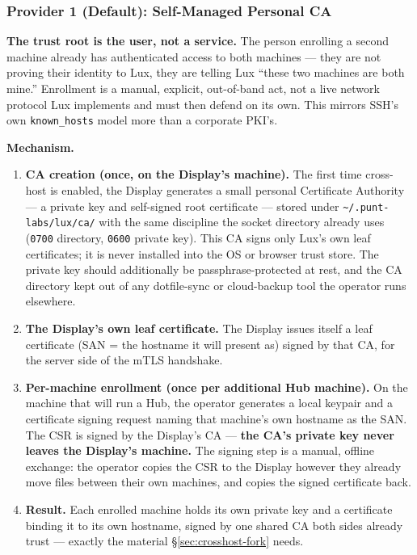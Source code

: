 \documentclass[a4paper,10pt]{article}
\begin{document}
\subsubsection{Provider 1 (Default): Self-Managed Personal CA}

\textbf{The trust root is the user, not a service.}  The person enrolling
a second machine already has authenticated access to both machines ---
they are not proving their identity to Lux, they are telling Lux ``these
two machines are both mine.''  Enrollment is a manual, explicit,
out-of-band act, not a live network protocol Lux implements and must then
defend on its own.  This mirrors SSH's own \texttt{known\_hosts} model
more than a corporate PKI's.

\textbf{Mechanism.}

\begin{enumerate}
  \item \textbf{CA creation (once, on the Display's machine).}  The first
    time cross-host is enabled, the Display generates a small personal
    Certificate Authority --- a private key and self-signed root
    certificate --- stored under
    \texttt{\textasciitilde{}/.punt-labs/lux/ca/} with the same discipline
    the socket directory already uses (\texttt{0700} directory,
    \texttt{0600} private key).  This CA signs only Lux's own leaf
    certificates; it is never installed into the OS or browser trust
    store.  The private key should additionally be passphrase-protected at
    rest, and the CA directory kept out of any dotfile-sync or
    cloud-backup tool the operator runs elsewhere.
  \item \textbf{The Display's own leaf certificate.}  The Display issues
    itself a leaf certificate (SAN = the hostname it will present as)
    signed by that CA, for the server side of the mTLS handshake.
  \item \textbf{Per-machine enrollment (once per additional Hub machine).}
    On the machine that will run a Hub, the operator generates a local
    keypair and a certificate signing request naming that machine's own
    hostname as the SAN.  The CSR is signed by the Display's CA ---
    \textbf{the CA's private key never leaves the Display's machine.}  The
    signing step is a manual, offline exchange: the operator copies the
    CSR to the Display however they already move files between their own
    machines, and copies the signed certificate back.
  \item \textbf{Result.}  Each enrolled machine holds its own private key
    and a certificate binding it to its own hostname, signed by one shared
    CA both sides already trust --- exactly the material
    \S\ref{sec:crosshost-fork} needs.
\end{enumerate}
\end{document}
